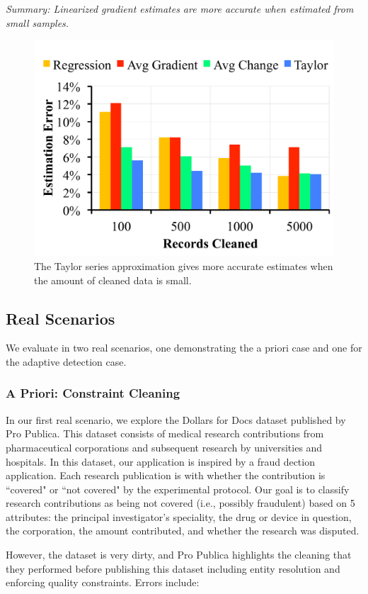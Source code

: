 \vspace{0.25em}

\noindent \emph{Summary: Linearized gradient estimates are more accurate when estimated from small samples. }

\begin{figure}[ht!]
\vspace{-2em}
\centering
 \includegraphics[width=0.5\columnwidth]{exp/exp12.pdf}
 \caption{The Taylor series approximation gives more accurate estimates when the amount of cleaned data is small. \label{tradeoffs3}}
\end{figure}


\subsection{Real Scenarios}
We evaluate \sys in two real scenarios, one demonstrating the a priori case and one for the adaptive detection case.

\subsubsection{A Priori: Constraint Cleaning}
In our first real scenario, we explore the Dollars for Docs dataset published by Pro Publica.
This dataset consists of medical research contributions from pharmaceutical corporations and subsequent research by universities and hospitals.
In this dataset, our application is inspired by a fraud dection application.
Each research publication is with whether the contribution is ``covered" or ``not covered" by the experimental protocol.
Our goal is to classify research contributions as being not covered (i.e., possibly fraudulent) based on 5 attributes: the principal investigator's speciality, the drug or device in question, the corporation, the amount contributed, and whether the research was disputed.

However, the dataset is very dirty, and Pro Publica highlights the cleaning that they performed before publishing this dataset \cite{dollarsfordocs} including entity resolution and enforcing quality constraints.
Errors include: 

